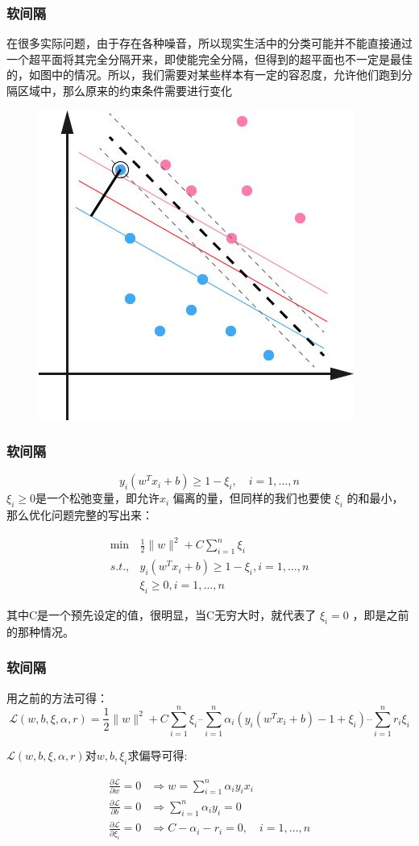 \begin{frame}

\frametitle{软间隔}
 在很多实际问题，由于存在各种噪音，所以现实生活中的分类可能并不能直接通过一个超平面将其完全分隔开来，即使能完全分隔，但得到的超平面也不一定是最佳的，如图中的情况。所以，我们需要对某些样本有一定的容忍度，允许他们跑到分隔区域中，那么原来的约束条件需要进行变化
 \begin{figure}[ht]
	\centering
	\includegraphics[width=0.5\linewidth]{partition/img/svm_12.jpg}  
	\end{figure}
 
\end{frame}


\begin{frame}

\frametitle{软间隔}
\[
y_i(w^Tx_i+b)\geq 1-\xi_i, \quad i=1,\ldots,n
\]
$\xi_i\geq 0$是一个松弛变量，即允许$ x_i$ 偏离的量，但同样的我们也要使 $\xi_i$ 的和最小，那么优化问题完整的写出来：

\begin{align*}
\min & \frac{1}{2}\|w\|^2 + C\sum_{i=1}^n\xi_i \\
 s.t., & y_i(w^Tx_i+b)\geq 1-\xi_i, i=1,\ldots,n \\
& \xi_i \geq 0, i=1,\ldots,n 
\end{align*}

其中C是一个预先设定的值，很明显，当C无穷大时，就代表了 $\xi_i=0$ ，即是之前的那种情况。

\end{frame}


\begin{frame}
\frametitle{软间隔}

用之前的方法可得：
\[
\mathcal{L}(w,b,\xi,\alpha,r)=\frac{1}{2}\|w\|^2 + C\sum_{i=1}^n\xi_i – \sum_{i=1}^n\alpha_i \left(y_i(w^Tx_i+b)-1+\xi_i\right) – \sum_{i=1}^n r_i\xi_i
\]

$\mathcal{L}(w,b,\xi,\alpha,r)$对$w,b,\xi_i$求偏导可得:

\begin{align*}
\frac{\partial \mathcal{L}}{\partial w}=0 &\Rightarrow w=\sum_{i=1}^n \alpha_i y_i x_i \\
\frac{\partial \mathcal{L}}{\partial b} = 0 &\Rightarrow \sum_{i=1}^n \alpha_i y_i = 0 \\
\frac{\partial \mathcal{L}}{\partial \xi_i} = 0 &\Rightarrow C-\alpha_i-r_i=0, \quad i=1,\ldots,n 
\end{align*}

\end{frame}


